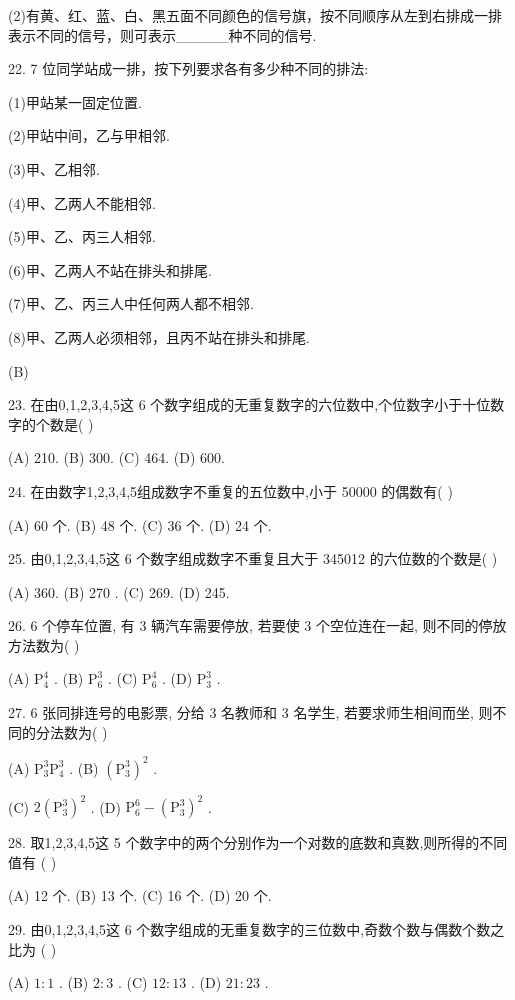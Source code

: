 \documentclass[10pt]{article}
\begin{document}
(2)有黄、红、蓝、白、黑五面不同颜色的信号旗，按不同顺序从左到右排成一排表示不同的信号，则可表示\_\_\_\_\_种不同的信号.

22. 7 位同学站成一排，按下列要求各有多少种不同的排法:

(1)甲站某一固定位置.

(2)甲站中间，乙与甲相邻.

(3)甲、乙相邻.

(4)甲、乙两人不能相邻.

(5)甲、乙、丙三人相邻.

(6)甲、乙两人不站在排头和排尾.

(7)甲、乙、丙三人中任何两人都不相邻.

(8)甲、乙两人必须相邻，且丙不站在排头和排尾.

(B)

23. 在由0,1,2,3,4,5这 6 个数字组成的无重复数字的六位数中,个位数字小于十位数字的个数是( )

(A) 210. (B) 300. (C) 464. (D) 600.

24. 在由数字1,2,3,4,5组成数字不重复的五位数中,小于 50000 的偶数有( )

(A) 60 个. (B) 48 个. (C) 36 个. (D) 24 个.

25. 由0,1,2,3,4,5这 6 个数字组成数字不重复且大于 345012 的六位数的个数是( )

(A) 360. (B) 270 . (C) 269. (D) 245.

26. 6 个停车位置, 有 3 辆汽车需要停放, 若要使 3 个空位连在一起, 则不同的停放方法数为( )

(A) \({\mathrm{P}}_{4}^{4}\) . (B) \({\mathrm{P}}_{6}^{3}\) . (C) \({\mathrm{P}}_{6}^{4}\) . (D) \({\mathrm{P}}_{3}^{3}\) .

27. 6 张同排连号的电影票, 分给 3 名教师和 3 名学生, 若要求师生相间而坐, 则不同的分法数为( )

(A) \({\mathrm{P}}_{3}^{3}{\mathrm{P}}_{4}^{3}\) . (B) \({\left( {\mathrm{P}}_{3}^{3}\right) }^{2}\) .

(C) \(2{\left( {\mathrm{P}}_{3}^{3}\right) }^{2}\) . (D) \({\mathrm{P}}_{6}^{6} - {\left( {\mathrm{P}}_{3}^{3}\right) }^{2}\) .

28. 取1,2,3,4,5这 5 个数字中的两个分别作为一个对数的底数和真数,则所得的不同值有 ( )

(A) 12 个. (B) 13 个. (C) 16 个. (D) 20 个.

29. 由0,1,2,3,4,5这 6 个数字组成的无重复数字的三位数中,奇数个数与偶数个数之比为 ( )

(A) \(1 : 1\) . (B) \(2 : 3\) . (C) \({12} : {13}\) . (D) \({21} : {23}\) .
\end{document}
